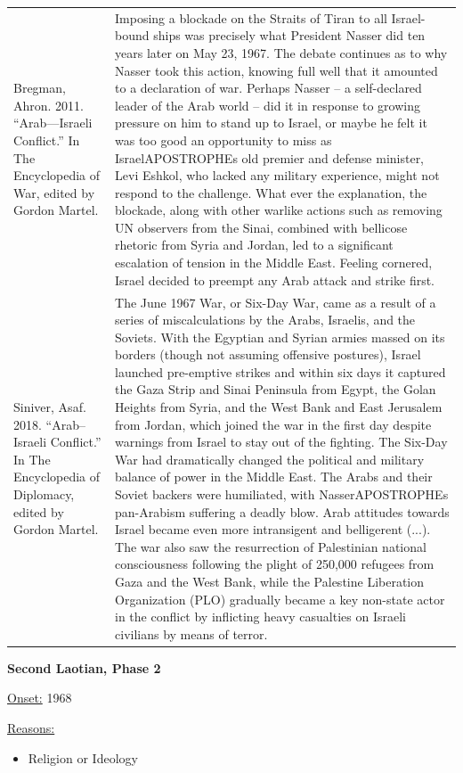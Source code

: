 {\begin{longtable}{p{}p{}}
Bregman, Ahron. 2011. “Arab—Israeli Conflict.” In The Encyclopedia of War, edited by Gordon Martel. & Imposing a blockade on the Straits of Tiran to all Israel-bound ships was precisely what President Nasser did ten years later on May 23, 1967. The debate continues as to why Nasser took this action, knowing full well that it amounted to a declaration of war. Perhaps Nasser – a self-declared leader of the Arab world – did it in response to growing pressure on him to stand up to Israel, or maybe he felt it was too good an opportunity to miss as IsraelAPOSTROPHEs old premier and defense minister, Levi Eshkol, who lacked any military experience, might not respond to the challenge. What ever the explanation, the blockade, along with other warlike actions such as removing UN observers from the Sinai, combined with bellicose rhetoric from Syria and Jordan, led to a significant escalation of tension in the Middle East. Feeling cornered, Israel decided to preempt any Arab attack and strike first.
\\
Siniver, Asaf. 2018. “Arab–Israeli Conflict.” In The Encyclopedia of Diplomacy, edited by Gordon Martel. & The June 1967 War, or Six-Day War, came as a result of a series of miscalculations by the Arabs, Israelis, and the Soviets. With the Egyptian and Syrian armies massed on its borders (though not assuming offensive postures), Israel launched pre-emptive strikes and within six days it captured the Gaza Strip and Sinai Peninsula from Egypt, the Golan Heights from Syria, and the West Bank and East Jerusalem from Jordan, which joined the war in the first day despite warnings from Israel to stay out of the fighting. The Six-Day War had dramatically changed the political and military balance of power in the Middle East. The Arabs and their Soviet backers were humiliated, with NasserAPOSTROPHEs pan-Arabism suffering a deadly blow. Arab attitudes towards Israel became even more intransigent and belligerent (...). The war also saw the resurrection of Palestinian national consciousness following the plight of 250,000 refugees from Gaza and the West Bank, while the Palestine Liberation Organization (PLO) gradually became a key non-state actor in the conflict by inflicting heavy casualties on Israeli civilians by means of terror.
\\
\end{longtable}}
\clearpage
         \textbf{Second Laotian, Phase 2} 

          \underline{Onset:} 1968         

\underline{Reasons:}
\begin{itemize}
\item Religion or Ideology
\end{itemize}


